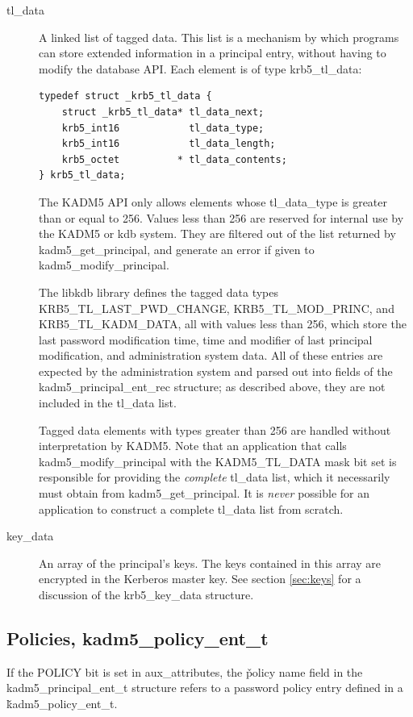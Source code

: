 \begin{description}
\item[tl_data] A linked list of tagged data.  This list is a mechanism
by which programs can store extended information in a principal entry,
without having to modify the database API.  Each element is of type
krb5_tl_data:
\begin{verbatim}
typedef struct _krb5_tl_data {
    struct _krb5_tl_data* tl_data_next;
    krb5_int16            tl_data_type;
    krb5_int16            tl_data_length;
    krb5_octet          * tl_data_contents;
} krb5_tl_data;
\end{verbatim}
%
The KADM5 API only allows elements whose tl_data_type is greater than
or equal to 256.  Values less than 256 are reserved for internal use
by the KADM5 or kdb system.  They are filtered out of the list
returned by kadm5_get_principal, and generate an error if given to
kadm5_modify_principal.

The libkdb library defines the tagged data types
KRB5_TL_LAST_PWD_CHANGE, KRB5_TL_MOD_PRINC, and KRB5_TL_KADM_DATA, all
with values less than 256, which store the last password modification
time, time and modifier of last principal modification, and
administration system data.  All of these entries are expected by the
administration system and parsed out into fields of the
kadm5_principal_ent_rec structure; as described above, they are not
included in the tl_data list.

Tagged data elements with types greater than 256 are handled without
interpretation by KADM5.  Note that an application that calls
kadm5_modify_principal with the KADM5_TL_DATA mask bit set is
responsible for providing the {\it complete} tl_data list, which it
necessarily must obtain from kadm5_get_principal.  It is {\it never}
possible for an application to construct a complete tl_data list from
scratch.

\item[key_data] An array of the principal's keys.  The keys contained
in this array are encrypted in the Kerberos master key.  See section
\ref{sec:keys} for a discussion of the krb5_key_data structure.
\end{description}

\subsection{Policies, kadm5_policy_ent_t}
\label{sec:policy-fields}

If the POLICY bit is set in aux_attributes, the \v{policy} name field
in the kadm5_principal_ent_t structure refers to a password policy
entry defined in a \v{kadm5_policy_ent_t}.


